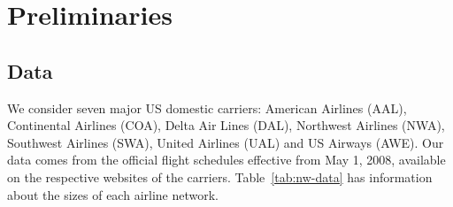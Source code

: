 \documentclass[10pt]{article}
\begin{document}
\section{Preliminaries}\label{sec:preliminaries}

\subsection{Data}\label{subsec:data}

We consider seven major US domestic carriers: American Airlines (AAL), Continental Airlines (COA), Delta Air Lines (DAL), Northwest Airlines (NWA), Southwest Airlines (SWA), United Airlines (UAL) and US Airways (AWE). Our data comes from the official flight schedules effective from May 1, 2008, available on the respective websites of the carriers. Table~\ref{tab:nw-data} has information about the sizes of each airline network.
\end{document}
